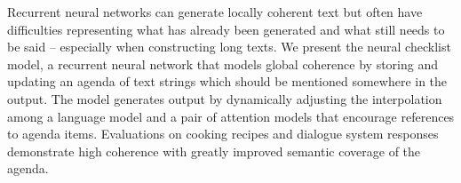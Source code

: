 Recurrent neural networks can generate locally coherent text but often have difficulties representing what has already been generated and what still needs to be said -- especially when constructing long texts. We present the neural checklist model, a recurrent neural network that models global coherence by storing and updating an agenda of text strings which should be mentioned somewhere in the output. The model generates output by dynamically adjusting the interpolation among a language model and a pair of attention models that encourage references to agenda items. Evaluations on cooking recipes and dialogue system responses demonstrate high coherence with greatly improved semantic coverage of the agenda.
